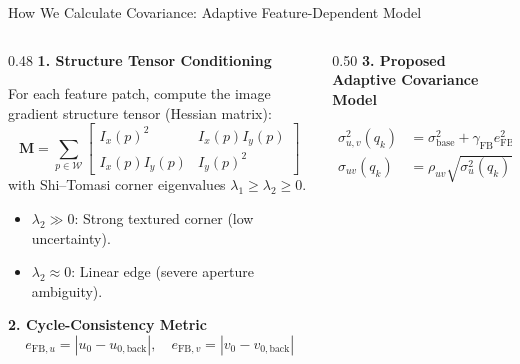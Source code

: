 \documentclass[aspectratio=169, 10pt]{beamer}
\begin{document}
\begin{frame}{How We Calculate Covariance: Adaptive Feature-Dependent Model}
  \begin{columns}[T]
    \begin{column}{0.48\textwidth}
      {\small \textbf{\textcolor{NavyBlue}{1. Structure Tensor Conditioning}}}
      \vspace{0.08cm}

      \scriptsize
      For each feature patch, compute the image gradient structure tensor (Hessian matrix):
      \begin{equation}
        \mathbf{M} = \sum_{p \in \mathcal{W}} \begin{bmatrix} I_x(p)^2 & I_x(p) I_y(p) \\ I_x(p) I_y(p) & I_y(p)^2 \end{bmatrix}
      \end{equation}
      with Shi--Tomasi corner eigenvalues $\lambda_1 \ge \lambda_2 \ge 0$.
      \begin{itemize}
        \setlength{\itemsep}{1.5pt}
        \item $\lambda_2 \gg 0$: Strong textured corner (low uncertainty).
        \item $\lambda_2 \approx 0$: Linear edge (severe aperture ambiguity).
      \end{itemize}

      \vspace{0.1cm}
      {\small \textbf{\textcolor{NavyBlue}{2. Cycle-Consistency Metric}}}
      \begin{equation}
        e_{\text{FB}, u} = |u_0 - u_{0,\text{back}}|, \quad e_{\text{FB}, v} = |v_0 - v_{0,\text{back}}|
      \end{equation}
    \end{column}

    \begin{column}{0.50\textwidth}
      {\small \textbf{\textcolor{NavyBlue}{3. Proposed Adaptive Covariance Model}}}
      \vspace{0.08cm}

      \begin{align}
        \sigma_{u,v}^2(q_k) &= \sigma_{\text{base}}^2 + \gamma_{\text{FB}} e_{\text{FB}, u,v}^2 + \alpha_{\text{ST}} \lambda_2^{-1/2} \\[2pt]
        \sigma_{uv}(q_k) &= \rho_{uv} \sqrt{\sigma_u^2(q_k) \, \sigma_v^2(q_k)}
      \end{align}
      \vspace{0.05cm}


\end{column}
\end{columns}
\end{frame}
\end{document}
